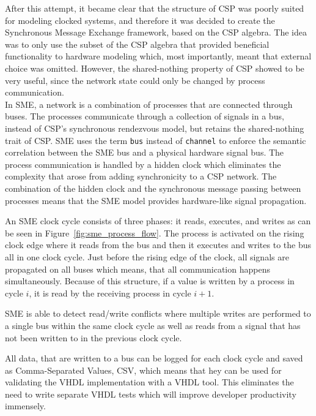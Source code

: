 After this attempt, it became clear that the structure of CSP was poorly suited for modeling clocked systems, and therefore it was decided to create the Synchronous Message Exchange framework, based on the CSP algebra. The idea was to only use the subset of the CSP algebra that provided beneficial functionality to hardware modeling which, most importantly, meant that external choice was omitted. However, the shared-nothing property of CSP showed to be very useful, since the network state could only be changed by process communication.
\\

In SME, a network is a combination of processes that are connected through buses. The processes communicate through a collection of signals in a bus, instead of CSP's synchronous rendezvous model, but retains the shared-nothing trait of CSP.
SME uses the term \texttt{bus} instead of \texttt{channel} to enforce the semantic correlation between the SME bus and a physical hardware signal bus.
The process communication is handled by a hidden clock which eliminates the complexity that arose from adding synchronicity to a CSP network. The combination of the hidden clock and the synchronous message passing between processes means that the SME model provides hardware-like signal propagation.

An SME clock cycle consists of three phases: it reads, executes, and writes as can be seen in Figure~\ref{fig:sme_process_flow}. The process is activated on the rising clock edge where it reads from the bus and then it executes and writes to the bus all in one clock cycle. Just before the rising edge of the clock, all signals are propagated on all buses which means, that all communication happens simultaneously. Because of this structure, if a value is written by a process in cycle $i$, it is read by the receiving process in cycle $i+1$.

SME is able to detect read/write conflicts where multiple writes are performed to a single bus within the same clock cycle as well as reads from a signal that has not been written to in the previous clock cycle.

All data, that are written to a bus can be logged for each clock cycle and saved as Comma-Separated Values, CSV, which means that hey can be used for validating the VHDL implementation with a VHDL tool. This eliminates the need to write separate VHDL tests which will improve developer productivity immensely.

